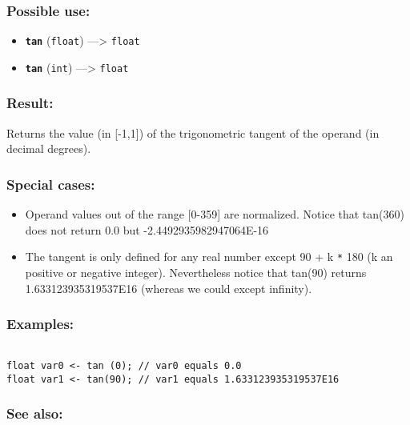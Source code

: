 \documentclass[]{book}
\providecommand{\tightlist}{%
  \setlength{\itemsep}{0pt}\setlength{\parskip}{0pt}}
\theoremstyle{definition}
\theoremstyle{definition}
\theoremstyle{definition}
\theoremstyle{remark}
\begin{document}
\subsubsection{Possible use:}\label{possible-use-512}

\begin{itemize}
\tightlist
\item
  \textbf{\texttt{tan}} (\texttt{float}) ---\textgreater{}
  \texttt{float}
\item
  \textbf{\texttt{tan}} (\texttt{int}) ---\textgreater{} \texttt{float}
\end{itemize}

\subsubsection{Result:}\label{result-495}

Returns the value (in {[}-1,1{]}) of the trigonometric tangent of the
operand (in decimal degrees).

\subsubsection{Special cases:}\label{special-cases-134}

\begin{itemize}
\tightlist
\item
  Operand values out of the range {[}0-359{]} are normalized. Notice
  that tan(360) does not return 0.0 but -2.4492935982947064E-16\\
\item
  The tangent is only defined for any real number except 90 + k
  \texttt{*} 180 (k an positive or negative integer). Nevertheless
  notice that tan(90) returns 1.633123935319537E16 (whereas we could
  except infinity).
\end{itemize}

\subsubsection{Examples:}\label{examples-354}

\begin{verbatim}
 
float var0 <- tan (0); // var0 equals 0.0 
float var1 <- tan(90); // var1 equals 1.633123935319537E16
\end{verbatim}

\subsubsection{See also:}\label{see-also-201}
\end{document}
